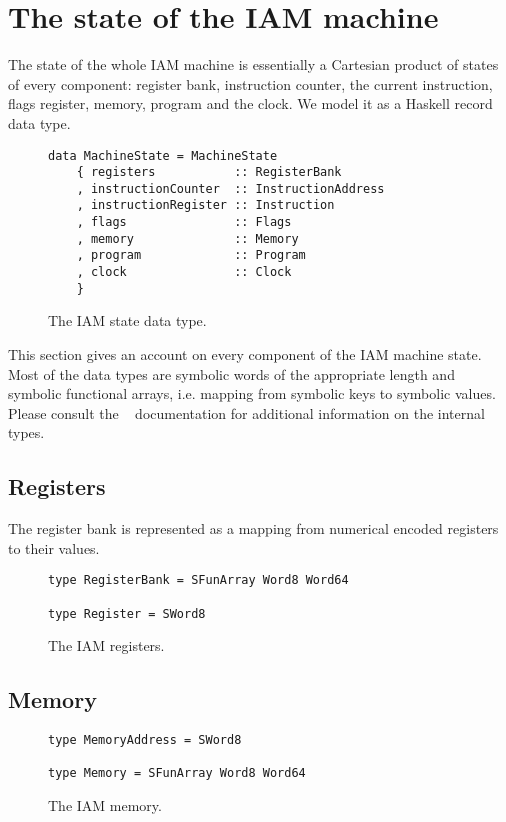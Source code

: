 \section{The state of the IAM machine}

The state of the whole IAM machine is essentially a Cartesian product of states
of every component: register bank, instruction counter, the current instruction,
flags register, memory, program and the clock. We model it as a Haskell record
data type.

\begin{figure}[H]
\begin{verbatim}
data MachineState = MachineState
    { registers           :: RegisterBank
    , instructionCounter  :: InstructionAddress
    , instructionRegister :: Instruction
    , flags               :: Flags
    , memory              :: Memory
    , program             :: Program
    , clock               :: Clock
    }
\end{verbatim}
\label{state}
\caption{The IAM state data type.}
\end{figure}

This section gives an account on every component of the IAM machine state. Most
of the data types are symbolic words of the appropriate length and symbolic functional
arrays, i.e. mapping from symbolic keys to symbolic values. Please consult the
~\cite{SBV} documentation for additional information on the internal types.

\subsection{Registers}

The register bank is represented as a mapping from numerical encoded registers
to their values.

\begin{figure}[H]
\begin{verbatim}
type RegisterBank = SFunArray Word8 Word64

type Register = SWord8
\end{verbatim}
\label{registers}
\caption{The IAM registers.}
\end{figure}

\subsection{Memory}

\begin{figure}[H]
\begin{verbatim}
type MemoryAddress = SWord8

type Memory = SFunArray Word8 Word64
\end{verbatim}
\label{memory}
\caption{The IAM memory.}
\end{figure}

